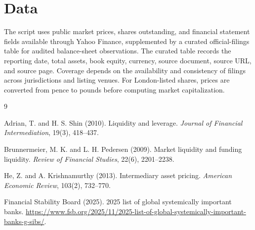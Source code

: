 \documentclass[11pt]{article}
\begin{document}
\section{Data}

The script uses public market prices, shares outstanding, and financial statement fields available through Yahoo Finance, supplemented by a curated official-filings table for audited balance-sheet observations. The curated table records the reporting date, total assets, book equity, currency, source document, source URL, and source page. Coverage depends on the availability and consistency of filings across jurisdictions and listing venues. For London-listed shares, prices are converted from pence to pounds before computing market capitalization.

\begin{thebibliography}{9}

Adrian, T. and H. S. Shin (2010).
Liquidity and leverage.
\textit{Journal of Financial Intermediation}, 19(3), 418--437.

Brunnermeier, M. K. and L. H. Pedersen (2009).
Market liquidity and funding liquidity.
\textit{Review of Financial Studies}, 22(6), 2201--2238.

He, Z. and A. Krishnamurthy (2013).
Intermediary asset pricing.
\textit{American Economic Review}, 103(2), 732--770.

Financial Stability Board (2025).
2025 list of global systemically important banks.
\url{https://www.fsb.org/2025/11/2025-list-of-global-systemically-important-banks-g-sibs/}.

\end{thebibliography}
\end{document}
